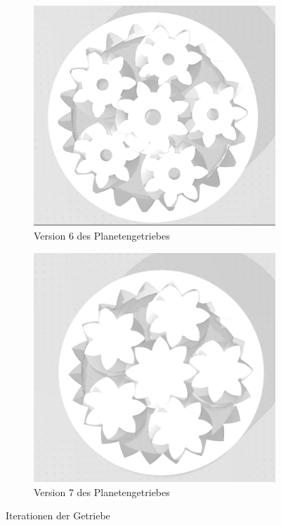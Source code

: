\begin{figure}[H]
	\begin{subfigure}[b]{0.4\textwidth}
		\includegraphics[width=\textwidth]{bilder/GetriebeVersion4-3.png}
		\caption{Version 6 des Planetengetriebes}
		\label{bild:gearversion4-3}
	\end{subfigure}
	\hspace{0.1\textwidth}%
	\begin{subfigure}[b]{0.4\textwidth}
		\includegraphics[width=\textwidth]{bilder/GetriebeVersion4-4.png}
		\caption{Version 7 des Planetengetriebes}
		\label{bild:gearversion4-4}
	\end{subfigure}

	\caption{Iterationen der Getriebe}
\end{figure}

